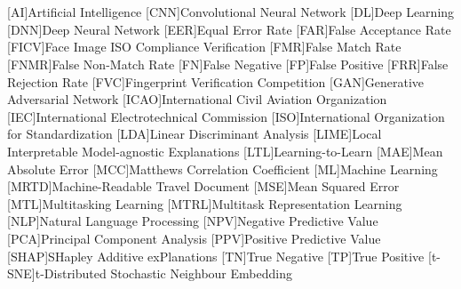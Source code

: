 \section*{} 

\begin{acronym}[FNMR]
[AI]{Artificial Intelligence}
[CNN]{Convolutional Neural Network}
[DL]{Deep Learning}
[DNN]{Deep Neural Network}
[EER]{Equal Error Rate}
[FAR]{False Acceptance Rate}
[FICV]{Face Image ISO Compliance Verification}
[FMR]{False Match Rate}
[FNMR]{False Non-Match Rate}
[FN]{False Negative}
[FP]{False Positive}
[FRR]{False Rejection Rate}
[FVC]{Fingerprint Verification Competition}
[GAN]{Generative Adversarial Network}
[ICAO]{International Civil Aviation Organization}
[IEC]{International Electrotechnical Commission}
[ISO]{International Organization for Standardization}
[LDA]{Linear Discriminant Analysis}
[LIME]{Local Interpretable Model-agnostic Explanations}
[LTL]{Learning-to-Learn}
[MAE]{Mean Absolute Error}
[MCC]{Matthews Correlation Coefficient}
[ML]{Machine Learning}
[MRTD]{Machine-Readable Travel Document}
[MSE]{Mean Squared Error}
[MTL]{Multitasking Learning}
[MTRL]{Multitask Representation Learning}
[NLP]{Natural Language Processing}
[NPV]{Negative Predictive Value}
[PCA]{Principal Component Analysis}
[PPV]{Positive Predictive Value}
[SHAP]{SHapley Additive exPlanations}
[TN]{True Negative}
[TP]{True Positive}
[t-SNE]{t-Distributed Stochastic Neighbour Embedding}
\end{acronym}


